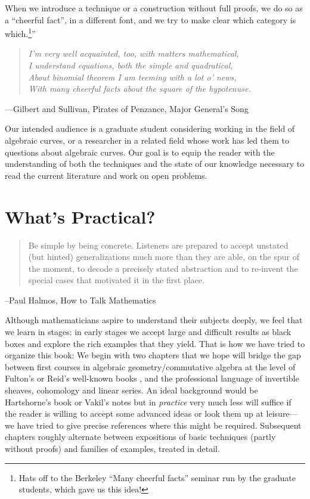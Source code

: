 When we introduce a technique or a construction without full proofs, we do so as a ``cheerful fact'', in a different font, 
and we try to make clear which category is which.\footnote{Hats off to the Berkeley ``Many cheerful facts'' seminar run
by the graduate students, which gave us this idea!}''

\begin{quote}\it{I'm very well acquainted, too, with matters mathematical,\\
I understand equations, both the simple and quadratical,\\
About binomial theorem I am teeming with a lot o' news,\\
With many cheerful facts about the square of the hypotenuse.}
\end{quote}
---Gilbert and Sullivan, Pirates of Penzance, Major General's Song


Our intended audience is a graduate student considering working in the field of algebraic curves, or a researcher in a related field whose work has led them to questions about algebraic curves. Our goal is to equip the reader with the understanding of both the techniques and the state of our knowledge necessary to read the current literature and work on open problems.

\section{What's Practical?}

\begin{quote}
Be simple by being concrete. Listeners are prepared to
accept unstated (but hinted) generalizations much more than they are able, on the spur of the moment, to
decode a precisely stated abstraction and to re-invent the special cases that motivated it in the first place. 
\end{quote}

--Paul Halmos, How to Talk Mathematics

Although mathematicians aspire to understand their subjects deeply, we feel that we learn in stages: in early stages we accept large and difficult results as black boxes and explore the rich examples that they yield. That is how we have tried to organize this book: 
We begin with two chapters that we hope will bridge the gap between first courses in algebraic geometry/commutative algebra at the level of Fulton's or  Reid's well-known books \cite{Fulton1989}, \cite{MR982494} and the professional language of invertible sheaves, cohomology and linear series. An ideal background would
be Hartshorne's book \cite{Hartshorne1977} or Vakil's notes \cite{Vakil-notes} but in \emph{practice} very much less will suffice if the reader is willing to accept some advanced ideas or look them up at leisure---we have tried to give precise references where this might be required. Subsequent chapters roughly alternate between expositions of basic techniques (partly without proofs) and families of examples, treated in detail. 

